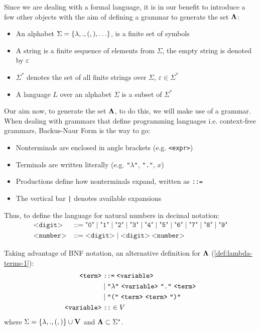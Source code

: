 \documentclass[12pt]{book}
\begin{document}
Since we are dealing with a formal language, it is in our benefit to introduce a few other objects with the aim of defining a grammar to generate the set $\mathbf{\Lambda}$:
\begin{itemize}
\item An alphabet \( \Sigma = \{ \lambda, ., (, ), \ldots \} \), is a finite set of symbols
\item A string is a finite sequence of elements from \( \Sigma \), the empty string is denoted by \( \varepsilon \)
\item \( \Sigma^* \) denotes the set of all finite strings over \( \Sigma \), \( \varepsilon \in \Sigma^* \)
\item A language \( L \) over an alphabet \( \Sigma \) is a subset of \( \Sigma^* \)
\end{itemize}
Our aim now, to generate the set $\mathbf{\Lambda}$,  to do this, we will make use of a grammar. When dealing with grammars that define programming languages i.e. context-free grammars, Backus-Naur Form is the way to go:
\begin{itemize}
\item Nonterminals are enclosed in angle brackets (e.g. \texttt{<expr>})
\item Terminals are written literally (e.g. \texttt{"$\lambda$"}, \texttt{"."}, $x$)
\item Productions define how nonterminals expand, written as \texttt{::=}
\item The vertical bar \texttt{|} denotes available expansions
\end{itemize}
Thus, to define the language for natural numbers in decimal notation:
\begin{align*}
  \texttt{<digit>} &\;\texttt{::=}\; \texttt{"0"} \;|\; \texttt{"1"} \;|\; \texttt{"2"} \;|\; \texttt{"3"} \;|\; \texttt{"4"} \;|\; \texttt{"5"} \;|\; \texttt{"6"} \;|\; \texttt{"7"} \;|\; \texttt{"8"} \;|\; \texttt{"9"} \\
  \texttt{<number>} &\;\texttt{::=}\; \texttt{<digit>} \;|\; \texttt{<digit>} \ \texttt{<number>}
\end{align*}
\begin{definition} Taking advantage of BNF notation, an alternative definition for $\mathbf{\Lambda}$ (\ref{def:lambda-terms-1}):
  \begin{align*}
    \texttt{<term>} &\;\texttt{::=}\; \texttt{<variable>} \\
                    &\;|\; \texttt{"$\la$"}\ \texttt{<variable>}\ \texttt{"."}\ \texttt{<term>} \\
                    &\;|\; \texttt{"("}\ \texttt{<term>}\ \texttt{<term>}\ \texttt{")"} \\
    \texttt{<variable>} &\;\texttt{::}\in V
  \end{align*}
  \label{def:lambda-terms-2}
  where \( \Sigma = \{ \lambda, ., (, )\} \cup \mathbf{V} \) and \( \mathbf{\Lambda} \subset \Sigma^* \).
\end{definition}
\end{document}
